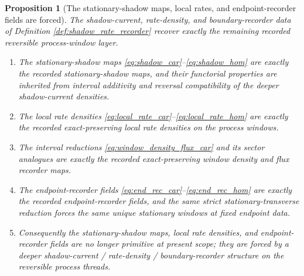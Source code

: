 \documentclass[11pt]{article}
\newtheorem{proposition}{Proposition}
\begin{document}
\begin{proposition}[The stationary-shadow maps, local rates, and endpoint-recorder fields are forced]
\label{prop:shadow_rate_recorder}
The shadow-current, rate-density, and boundary-recorder data of Definition \ref{def:shadow_rate_recorder} recover exactly the remaining recorded reversible process-window layer.
\begin{enumerate}
    \item The stationary-shadow maps \eqref{eq:shadow_car}--\eqref{eq:shadow_hom} are exactly the recorded stationary-shadow maps, and their functorial properties are inherited from interval additivity and reversal compatibility of the deeper shadow-current densities.
    \item The local rate densities \eqref{eq:local_rate_car}--\eqref{eq:local_rate_hom} are exactly the recorded exact-preserving local rate densities on the process windows.
    \item The interval reductions \eqref{eq:window_density_flux_car} and its sector analogues are exactly the recorded exact-preserving window density and flux recorder maps.
    \item The endpoint-recorder fields \eqref{eq:end_rec_car}--\eqref{eq:end_rec_hom} are exactly the recorded endpoint-recorder fields, and the same strict stationary-transverse reduction forces the same unique stationary windows at fixed endpoint data.
    \item Consequently the stationary-shadow maps, local rate densities, and endpoint-recorder fields are no longer primitive at present scope; they are forced by a deeper shadow-current / rate-density / boundary-recorder structure on the reversible process threads.
\end{enumerate}
\end{proposition}
\end{document}
